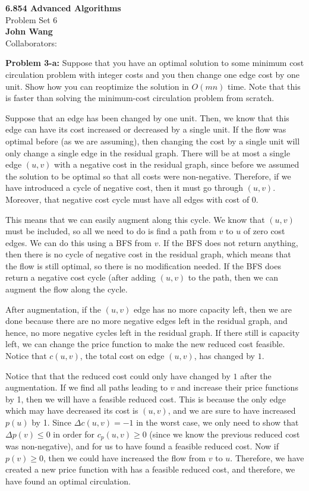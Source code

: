 \documentclass[psamsfonts]{amsart}
\newenvironment{sol}{\vspace{0.25cm}{\large \bfseries Solution:}}{\qedsymbol}
\newenvironment{prob}[1]{\begin{framed}{\large \bfseries Problem #1:}}{\end{framed}}
\newcommand{\makenewtitle}{
    \begin{center}
    {\huge \bfseries 6.854 Advanced Algorithms} \\
    Problem Set 6\\
    \vspace{0.25cm}
    {\bfseries John Wang} \\
    Collaborators: 
    \end{center}
    \vspace{0.5cm}
}
\begin{document}
\newpage
\makenewtitle

\begin{prob}{3-a}
Suppose that you have an optimal solution to some minimum cost circulation problem with integer costs and you then change one edge cost by one unit. Show how you can reoptimize the solution in $O(mn)$ time. Note that this is faster than solving the minimum-cost circulation problem from scratch.
\end{prob}

\begin{sol}
Suppose that an edge has been changed by one unit. Then, we know that this edge can have its cost increased or decreased by a single unit. If the flow was optimal before (as we are assuming), then changing the cost by a single unit will only change a single edge in the residual graph. There will be at most a single edge $(u,v)$ with a negative cost in the residual graph, since before we assumed the solution to be optimal so that all costs were non-negative. Therefore, if we have introduced a cycle of negative cost, then it must go through $(u,v)$. Moreover, that negative cost cycle must have all edges with cost of 0. 

This means that we can easily augment along this cycle. We know that $(u,v)$ must be included, so all we need to do is find a path from $v$ to $u$ of zero cost edges. We can do this using a BFS from $v$. If the BFS does not return anything, then there is no cycle of negative cost in the residual graph, which means that the flow is still optimal, so there is no modification needed. If the BFS does return a negative cost cycle (after adding $(u,v)$ to the path, then we can augment the flow along the cycle. 

After augmentation, if the $(u,v)$ edge has no more capacity left, then we are done because there are no more negative edges left in the residual graph, and hence, no more negative cycles left in the residual graph. If there still is capacity left, we can change the price function to make the new reduced cost feasible. Notice that $c(u,v)$, the total cost on edge $(u,v)$, has changed by $1$. 

Notice that that the reduced cost could only have changed by $1$ after the augmentation. If we find all paths leading to $v$ and increase their price functions by 1, then we will have a feasible reduced cost. This is because the only edge which may have decreased its cost is $(u,v)$, and we are sure to have increased $p(u)$ by 1. Since $\Delta c(u,v) = -1$ in the worst case, we only need to show that $\Delta p(v) \leq 0$ in order for $c_p(u,v) \geq 0$ (since we know the previous reduced cost was non-negative), and for us to have found a feasible reduced cost. Now if $p(v) \geq 0$, then we could have increased the flow from $v$ to $u$. Therefore, we have created a new price function with has a feasible reduced cost, and therefore, we have found an optimal circulation.
\end{sol}
\end{document}
